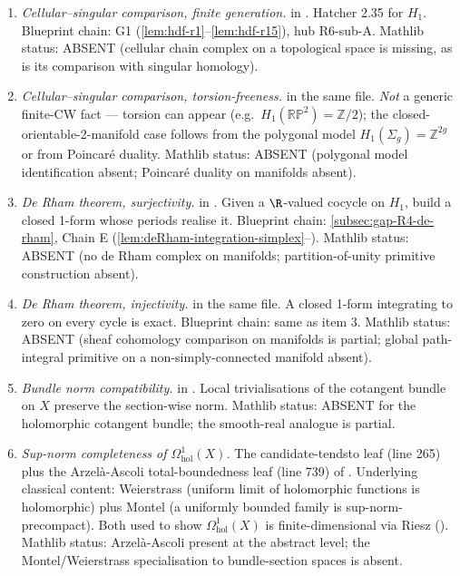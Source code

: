 \begin{enumerate}
\item \emph{Cellular--singular comparison, finite generation.}
 in
.  Hatcher 2.35 for
$H_1$.  Blueprint chain: G1 (\ref{lem:hdf-r1}--\ref{lem:hdf-r15}),
hub R6-sub-A.  Mathlib status: ABSENT (cellular chain complex on a
topological space is missing, as is its comparison with singular
homology).

\item \emph{Cellular--singular comparison, torsion-freeness.}
 in the same file.
\emph{Not} a generic finite-CW fact --- torsion can appear (e.g.\
$H_1(\mathbb{RP}^2) = \mathbb{Z}/2$); the closed-orientable-2-manifold
case follows from the polygonal model
$H_1(\Sigma_g) = \mathbb{Z}^{2g}$ or from Poincar\'e duality.
Mathlib status: ABSENT (polygonal model identification absent;
Poincar\'e duality on manifolds absent).

\item \emph{De Rham theorem, surjectivity.}
 in
.  Given a
$\R$-valued cocycle on $H_1$, build a closed 1-form whose periods
realise it.  Blueprint chain: \ref{subsec:gap-R4-de-rham}, Chain E
(\ref{lem:deRham-integration-simplex}--).  Mathlib status: ABSENT
(no de Rham complex on manifolds; partition-of-unity primitive
construction absent).

\item \emph{De Rham theorem, injectivity.}
 in the same file.
A closed 1-form integrating to zero on every cycle is exact.  Blueprint
chain: same as item 3.  Mathlib status: ABSENT (sheaf cohomology
comparison on manifolds is partial; global path-integral primitive on
a non-simply-connected manifold absent).

\item \emph{Bundle norm compatibility.}
 in
.  Local
trivialisations of the cotangent bundle on $X$ preserve the
section-wise norm.  Mathlib status: ABSENT for the holomorphic
cotangent bundle; the smooth-real analogue is partial.

\item \emph{Sup-norm completeness of $\Omega^1_{\mathrm{hol}}(X)$.}
The candidate-tendsto leaf (line 265) plus the Arzel\`a-Ascoli
total-boundedness leaf (line 739) of
.
Underlying classical content: Weierstrass (uniform limit of
holomorphic functions is holomorphic) plus Montel (a uniformly bounded
family is sup-norm-precompact).  Both used to show
$\Omega^1_{\mathrm{hol}}(X)$ is finite-dimensional via Riesz
().  Mathlib status:
Arzel\`a-Ascoli present at the abstract level; the Montel/Weierstrass
specialisation to bundle-section spaces is absent.
\end{enumerate}

